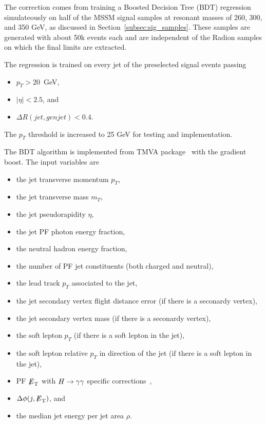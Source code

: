 The correction comes from training a Boosted Decision Tree (BDT) regression simulateously
on half of the MSSM signal
samples at resonant masses of 260, 300, and 350 GeV, as discussed in Section~\ref{subsec:sig_samples}.
These samples are generated with about 50k events each and are independent of the Radion
samples on which the final limits are extracted.

The regression is trained on every jet of the preselected signal events passing 
\begin{itemize}
\item $p_T > 20$~GeV,
\item $|\eta|<2.5$, and
\item $\Delta R (jet, genjet) < 0.4$.
\end{itemize}                                                                                           
The $p_T$ threshold is increased to 25 GeV for testing and implementation.

The BDT algorithm is implemented from TMVA package~\cite{TMVA2007} with the gradient boost.
The input variables are
\begin{itemize}
\item the jet transverse momentum $p_T$,
\item the jet transverse mass $m_T$,
\item the jet pseudorapidity $\eta$,
\item the jet PF photon energy fraction,
\item the neutral hadron energy fraction,
\item the number of PF jet constituents (both charged and neutral),
\item the lead track $p_T$ associated to the jet,
\item the jet secondary vertex flight distance error (if there is a seconardy vertex),
\item the jet secondary vertex mass (if there is a seconardy vertex),
\item the soft lepton $p_T$ (if there is a soft lepton in the jet),
\item the soft lepton relative $p_T$ in direction of the jet (if there is a soft lepton in the jet),
\item PF ${\not\mathrel{E}}_{\text{T}}$ with $H\to\gamma\gamma$ specific corrections~\cite{HggCMS},
\item $\Delta \phi (j, {\not\mathrel{E}}_{\text{T}})$, and
\item the median jet energy per jet area $\rho$. 
\end{itemize}

